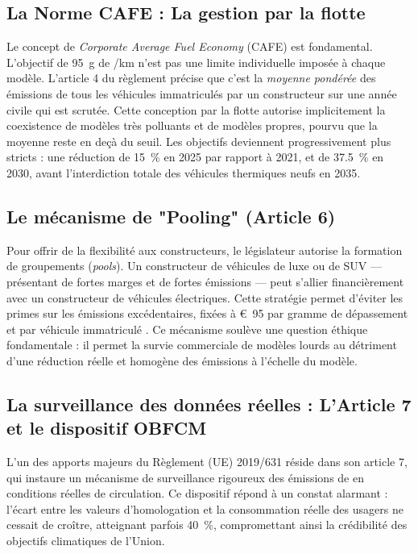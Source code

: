 \documentclass[12pt, a4paper]{article}
\begin{document}
\subsection{La Norme CAFE : La gestion par la flotte}

Le concept de \textit{Corporate Average Fuel Economy} (CAFE) est fondamental. L'objectif de \SI{95}{\gram} de /km n'est pas une limite individuelle imposée à chaque modèle. L'article 4 du règlement précise que c'est la \textit{moyenne pondérée} des émissions de tous les véhicules immatriculés par un constructeur sur une année civile qui est scrutée. Cette conception par la flotte autorise implicitement la coexistence de modèles très polluants et de modèles propres, pourvu que la moyenne reste en deçà du seuil. Les objectifs deviennent progressivement plus stricts : une réduction de \SI{15}{\percent} en 2025 par rapport à 2021, et de \SI{37.5}{\percent} en 2030, avant l'interdiction totale des véhicules thermiques neufs en 2035.

\subsection{Le mécanisme de "Pooling" (Article 6)}

Pour offrir de la flexibilité aux constructeurs, le législateur autorise la formation de groupements (\textit{pools}). Un constructeur de véhicules de luxe ou de SUV --- présentant de fortes marges et de fortes émissions --- peut s'allier financièrement avec un constructeur de véhicules électriques. Cette stratégie permet d'éviter les primes sur les émissions excédentaires, fixées à \SI{95}[\euro]{} par gramme de dépassement et par véhicule immatriculé \cite{ue2019}. Ce mécanisme soulève une question éthique fondamentale : il permet la survie commerciale de modèles lourds au détriment d'une réduction réelle et homogène des émissions à l'échelle du modèle.

\subsection{La surveillance des données réelles : L'Article 7 et le dispositif OBFCM}

L'un des apports majeurs du Règlement (UE) 2019/631 réside dans son article 7, qui instaure un mécanisme de surveillance rigoureux des émissions de  en conditions réelles de circulation. Ce dispositif répond à un constat alarmant : l'écart entre les valeurs d'homologation et la consommation réelle des usagers ne cessait de croître, atteignant parfois \SI{40}{\percent}, compromettant ainsi la crédibilité des objectifs climatiques de l'Union.
\end{document}
